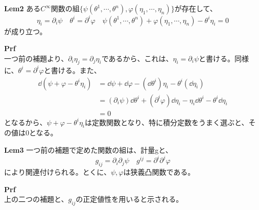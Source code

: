 \documentclass[a4paper,11pt]{jsarticle}
\numberwithin{equation}{section}
\begin{document}
\begin{itembox}[l]{\textbf{Lem2}}
    ある$C^{\infty}$関数の組$\{\psi(\theta^1,\cdots,\theta^n),\varphi(\eta_1,\cdots,\eta_n)\}$が存在して、
    \begin{equation}
        \eta_i = \partial_i \psi \quad \theta^i = \partial^i \varphi \quad \psi(\theta^1,\cdots,\theta^n) + \varphi(\eta_1,\cdots,\eta_n) - \theta^i\eta_i = 0
    \end{equation}
    が成り立つ。
\end{itembox}
\textbf{Prf}\\
一つ前の補題より、$\partial_i \eta_j = \partial_j \eta_i$であるから、これは、$\eta_i = \partial_i \psi$と書ける。同様に、$\theta^i = \partial^i \varphi$と書ける。また、
\begin{align}
    \dd (\psi + \varphi - \theta^i\eta_i) &= \dd \psi + \dd \varphi - (\dd \theta^i)\eta_i - \theta^i(\dd \eta_i) \\
    &=(\partial_i \psi )\dd \theta^i + (\partial^i \varphi)\dd \eta_i - \eta_i \dd \theta^i - \theta^i \dd \eta_i \\
    &=0
\end{align}
となるから、$\psi + \varphi - \theta^i\eta_i$は定数関数となり、特に積分定数をうまく選ぶと、その値は0となる。\hfill\qedsymbol

\begin{itembox}[l]{\textbf{Lem3}}
    一つ前の補題で定めた関数の組は、計量gと、
    \begin{equation}
        g_{ij} = \partial_i \partial_j \psi \quad g^{ij} = \partial^i \partial^j \varphi
    \end{equation}
    により関連付けられる。とくに、$\psi,\varphi$は狭義凸関数である。
\end{itembox}
\textbf{Prf}\\
上の二つの補題と、$g_{ij}$の正定値性を用いると示される。\hfill\qedsymbol
\end{document}
